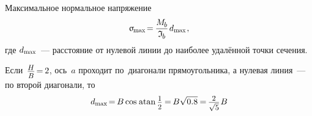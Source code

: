 \documentclass[14pt]{extarticle}
\begin{document}
Максимальное нормальное напряжение
\[
\upsigma_{\hspace{-0.2ex}\scalebox{.75}{max}} \hspace{-.33ex}
= \hspace{-.15ex} \displaystyle\frac{M_{\hspace{-0.1ex}\scalebox{.8}{$b$}}}{\mathfrak{I}_{\hspace{-0.1ex}\scalebox{.8}{$b$}}} \hspace{.25ex} d_{\scalebox{.75}{max}}
\hspace{.2ex} ,
\]
где ${d_{\scalebox{.75}{max}}}$~--- расстояние от нулевой линии до наиболее удалённой точки сечения.

\vspace{.4cm}
Если ${\hspace{.2ex}\scalebox{.84}{$\displaystyle\frac{\raisebox{-0.2em}{$H$}}{B}$} \hspace{-0.3ex}=\hspace{-0.2ex} 2}$, ось~$a$ проходит по~диагонали прямоугольника, а нулевая линия~---по второй диагонали, то
\nopagebreak\vspace{-0.2em}\[
d_{\scalebox{.75}{max}} \hspace{-.3ex}
= \hspace{-.2ex}
B \operatorname{cos} \hspace{.2ex} \operatorname{atan} \scalebox{.88}{$\displaystyle\frac{\raisebox{-0.2em}{$1$}}{2}$} \hspace{-.1ex}
= \hspace{-.2ex}
B \sqrt{0.8} \hspace{-.1ex}
= \hspace{-.2ex}
\scalebox{.88}{$ \displaystyle\frac{\raisebox{-0.18em}{$2$}}{\sqrt{5}} $} \hspace{.2ex} B
\]
\end{document}
